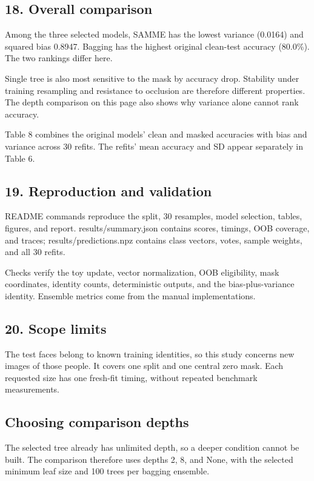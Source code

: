 \documentclass[10pt,twocolumn,letterpaper]{article}
\begin{document}
\subsection*{18. Overall comparison}
Among the three selected models, SAMME has the lowest variance (0.0164) and squared bias 0.8947. Bagging has the highest original clean-test accuracy (80.0\%). The two rankings differ here.

Single tree is also most sensitive to the mask by accuracy drop. Stability under training resampling and resistance to occlusion are therefore different properties. The depth comparison on this page also shows why variance alone cannot rank accuracy.

Table 8 combines the original models' clean and masked accuracies with bias and variance across 30 refits. The refits' mean accuracy and SD appear separately in Table 6.

\subsection*{19. Reproduction and validation}
README commands reproduce the split, 30 resamples, model selection, tables, figures, and report. results/summary.json contains scores, timings, OOB coverage, and traces; results/predictions.npz contains class vectors, votes, sample weights, and all 30 refits.

Checks verify the toy update, vector normalization, OOB eligibility, mask coordinates, identity counts, deterministic outputs, and the bias-plus-variance identity. Ensemble metrics come from the manual implementations.

\subsection*{20. Scope limits}
The test faces belong to known training identities, so this study concerns new images of those people. It covers one split and one central zero mask. Each requested size has one fresh-fit timing, without repeated benchmark measurements.

\newpage
\subsection*{Choosing comparison depths}
The selected tree already has unlimited depth, so a deeper condition cannot be built. The comparison therefore uses depths 2, 8, and None, with the selected minimum leaf size and 100 trees per bagging ensemble.
\end{document}
